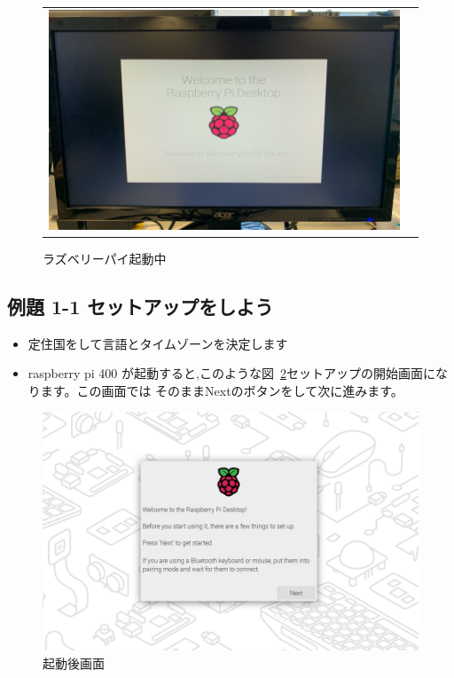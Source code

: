 \begin{enumerate}
\begin{itemize}
\begin{figure}[H]
\begin{tabular}{cc}
          \begin{minipage}{0.45\textwidth}
            \centering
            \includegraphics[width=0.8\linewidth]{text01-img/textbook-img0212023.png}
            \caption{ラズベリーパイ起動中}\label{fig:8}
          \end{minipage}
        \end{tabular}
      \end{figure}

    \end{itemize}

\end{enumerate}
\clearpage


% 
% 
\subsection*{例題 1-1 セットアップをしよう}
  \begin{itemize}
    \item 定住国をして言語とタイムゾーンを決定します
    \item raspberry pi 400 が起動すると,このような図~\ref{fig:9}セットアップの開始画面になります。この画面では
    そのままNextのボタンをして次に進みます。
  \end{itemize}
  \begin{figure}[h]
    \centering
    \begin{minipage}{0.5\textwidth}
      \includegraphics[width=0.9\linewidth]{text01-img/sw_image01.png}
      \caption{起動後画面}\label{fig:9}
    \end{minipage}
  \end{figure}

